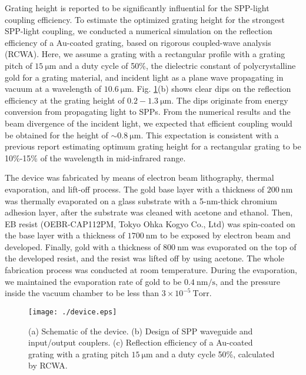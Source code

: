 \documentclass[twocolumn,10.5pt,a4]{article}
\begin{document}
Grating height is reported to be significantly influential for the SPP-light coupling efficiency\cite{Koev}\cite{Justin}. 
To estimate the optimized grating height for the strongest SPP-light coupling, we conducted a numerical simulation on the reflection efficiency of a Au-coated grating, based on rigorous coupled-wave analysis (RCWA)\cite{Leveque}. 
Here, we assume a grating with a rectangular profile with a grating pitch of $15\:\mathrm{\mu m}$ and a duty cycle of 50\%, the dielectric constant of polycrystalline gold for a grating material, and incident light as a plane wave propagating in vacuum at a wavelength of $10.6\:\mathrm{\mu m}$.
Fig. \ref{fig:Device}(b) shows clear dips on the reflection efficiency at the grating height of $0.2-1.3\:\mathrm{\mu m}$.
The dips originate from energy conversion from propagating light to SPPs.
From the numerical results and the beam divergence of the incident light, we expected that efficient coupling would be obtained for the height of $\sim0.8\:\mathrm{\mu m}$. This expectation is consistent with a previous report estimating optimum grating height for a rectangular grating to be 10\%-15\% of the wavelength in mid-infrared range\cite{Justin}.

The device was fabricated by means of electron beam lithography, thermal evaporation, and lift-off process. The gold base layer with a thickness of $200\:\mathrm{nm}$ was thermally evaporated on a glass substrate with a 5-nm-thick chromium adhesion layer, after the substrate was cleaned with acetone and ethanol. Then, EB resist (OEBR-CAP112PM, Tokyo Ohka Kogyo Co., Ltd) was spin-coated on the base layer with a thickness of $1700\:\mathrm{nm}$ to be exposed by electron beam and developed. Finally, gold with a thickness of $800\:\mathrm{nm}$ was evaporated on the top of the developed resist, and the resist was lifted off by using acetone. The whole fabrication process was conducted at room temperature. During the evaporation, we maintained the evaporation rate of gold to be $0.4\:\mathrm{nm/s}$, and the pressure inside the vacuum chamber to be less than $3\times10^{-5}\:\mathrm{Torr}$. 

 \begin{figure}[!htbp]
   \begin{center}
    \texttt{[image: ./device.eps]}
    \caption{(a) Schematic of the device. (b) Design of SPP waveguide and input/output couplers. (c) Reflection efficiency of a Au-coated grating with a grating pitch $15\:\mathrm{\mu m}$ and a duty cycle 50\%, calculated by RCWA.}
     \label{fig:Device}
   \end{center}
\end{figure}
\end{document}
